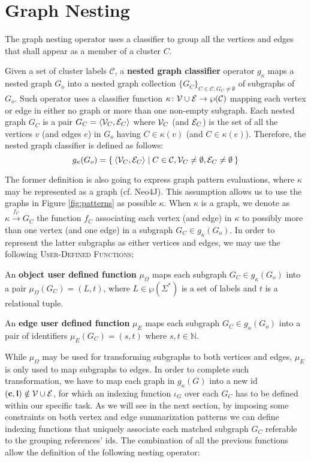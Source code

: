 \section{Graph Nesting}\label{sec:nestingdef}
The graph nesting operator uses a classifier to group all the vertices and edges that shall appear as a member of a cluster $C$. 

\begin{definition}
	Given a set of cluster labels $\mathcal{C}$, a \textbf{nested graph classifier} operator $g_\kappa$ maps a nested graph $G_o$ into a nested  graph collection $\{G_C\}_{C\in\mathcal{C},G_C\neq \emptyset}$ of subgraphs of $G_o$. Such operator uses a classifier function $\kappa\colon \mathcal{V}\cup \mathcal{E}\to \wp(\mathcal{C})$ mapping each vertex or edge in either no graph or more than one non-empty subgraph. Each nested graph $G_C$ is a pair
	$G_C=\Braket{\mathcal{V}_C,\mathcal{E}_C}$
	where $\mathcal{V}_C$ (and $\mathcal{E}_C$) is the set of all the vertices $v$ (and edges $e$) in $G_o$ having $C\in \kappa(v)$ (and $C\in \kappa(e)$). Therefore, the nested graph classifier is defined as follows:
	\[g_\kappa(G_o)=\Set{\Braket{\mathcal{V}_C,\mathcal{E}_C}|C\in\mathcal{C},\mathcal{V}_C\neq\emptyset,\mathcal{E}_C\neq\emptyset}\]
\end{definition}

The former definition is also going to express graph pattern evaluations, where $\kappa$ may be represented as a graph (cf. Neo4J). This assumption allows us to use the graphs in Figure \ref{fig:patterns} as possible $\kappa$. When $\kappa$ is a graph, we denote as $\kappa\xrightarrow{f_C} G_C$ the function $f_C$ associating  each vertex (and edge) in $\kappa$ to possibly more than one vertex (and one edge) in a subgraph $G_C\in g_\kappa(G_o)$. In order to represent the latter subgraphs  as either vertices and edges, we may use
the following \textsc{User-Defined Functions}:
\begin{definition}
	An \textbf{object user defined function} $\mu_\Omega$ maps each subgraph $G_C\in g_\kappa(G_o)$ into a pair $\mu_\Omega(G_C)=(L,t)$, where $L\in\wp(\Sigma^*)$ is a set of labels and $t$ is a relational tuple.
	
	An \textbf{edge user defined function} $\mu_E$ maps each subgraph $G_C\in g_\kappa(G_o)$ into a pair of identifiers $\mu_E(G_C)=(s,t)$ where $s,t\in\mathbb{N}$.
\end{definition}

While $\mu_\Omega$ may be used for transforming subgraphs to both vertices and edges, $\mu_E$ is only used to map subgraphs to edges.  
In order to complete such transformation, we have to map each graph in $g_\kappa(G)$ into a new id $(\textbf{c},\textbf{i})\notin \mathcal{V}\cup \mathcal{E}$, for which an indexing function $\iota_G$ over each $G_C$ has to be defined within our specific task. As we will see in the next section, by imposing some constraints on both vertex and edge summarization patterns we can define indexing functions that uniquely associate each matched subgraph  $G_C$ referable to the grouping references' ids.
The combination of all the previous functions allow the definition of the following nesting operator:



